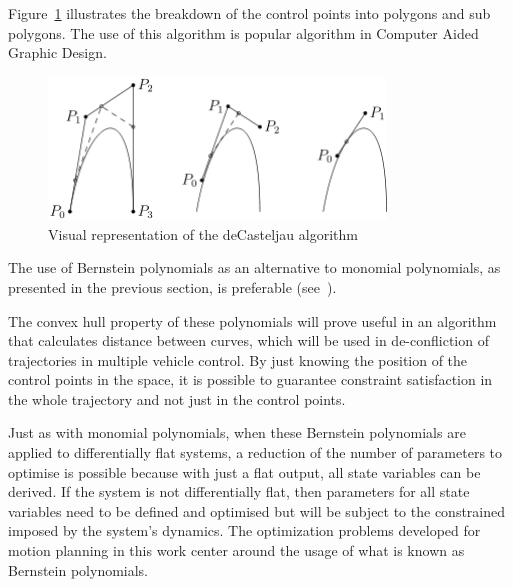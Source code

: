 Figure~\ref{fig:deCasteljau} illustrates the breakdown of the control points into polygons and sub polygons. The use of this algorithm is popular algorithm in Computer Aided Graphic Design.

\begin{figure}[h!]
\centering
\includegraphics[width=0.8\textwidth]{Images/deCasteljau.png}
\caption{Visual representation of the deCasteljau algorithm}
\label{fig:deCasteljau}
\end{figure}




\par The use of Bernstein polynomials as an alternative to monomial polynomials, as presented in the previous section, is preferable (see~\cite{cichella2018bernstein}). 

The convex hull property of these polynomials will prove useful in an algorithm that calculates distance between curves, which will be used in de-confliction of trajectories in multiple vehicle control. By just knowing the position of the control points in the space, it is possible to guarantee constraint satisfaction in the whole trajectory and not just in the control points.

\par Just as with monomial polynomials, when these Bernstein polynomials are applied to differentially flat systems, a reduction of the number of parameters to optimise is possible because with just a flat output, all state variables can be derived. If the system is not differentially flat, then parameters for all state variables need to be defined and optimised but will be subject to the constrained imposed by the system's dynamics.
The optimization problems developed for motion planning in this work center around the usage of what is known as Bernstein polynomials.

